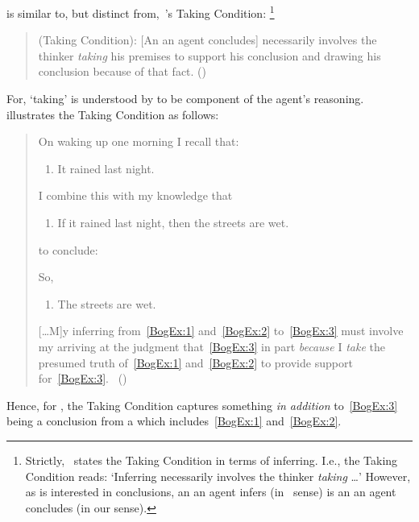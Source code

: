 \begin{note}
  \supportI{} is similar to, but distinct from,~\citeauthor{Boghossian:2014aa}'s Taking Condition:%
  \footnote{
    Strictly,~\citeauthor{Boghossian:2014aa} states the Taking Condition in terms of inferring.
    I.e., the Taking Condition reads: `Inferring necessarily involves the thinker \emph{taking} \dots'
    However, as \citeauthor{Boghossian:2008vf} is interested in conclusions, an  an agent infers (in~\citeauthor{Boghossian:2014aa} sense) is an  an agent concludes (in our sense).
  }

  \begin{quote}
    (Taking Condition):
    [An  an agent concludes] necessarily involves the thinker \emph{taking} his premises to support his conclusion and drawing his conclusion because of that fact.%
    \mbox{}\hfill\mbox{(\citeyear[5]{Boghossian:2014aa})}
  \end{quote}

  \noindent%
  For, `taking' is understood by \citeauthor{Boghossian:2014aa} to be component of the agent's reasoning.
  \citeauthor{Boghossian:2014aa} illustrates the Taking Condition as follows:
  \begin{quote}
    On waking up one morning I recall that:

    \begin{enumerate}[label=(\arabic*), ref=(\arabic*), series=BogEx]
    \item
      \label{BogEx:1}
      It rained last night.
    \end{enumerate}

    I combine this with my knowledge that

    \begin{enumerate}[label=(\arabic*), ref=(\arabic*), resume*=BogEx]
    \item
      \label{BogEx:2}
      If it rained last night, then the streets are wet.
    \end{enumerate}

    to conclude:

    So,

    \begin{enumerate}[label=(\arabic*), ref=(\arabic*), resume*=BogEx]
    \item
      \label{BogEx:3}
      The streets are wet.
    \end{enumerate}

    [\dots M]y inferring from~\ref{BogEx:1} and~\ref{BogEx:2} to~\ref{BogEx:3} must involve my arriving at the judgment that~\ref{BogEx:3} in part \emph{because} I \emph{take} the presumed truth of~\ref{BogEx:1} and~\ref{BogEx:2} to provide support for~\ref{BogEx:3}.%
    \mbox{ }\hfill\mbox{(\citeyear[2,4]{Boghossian:2014aa})}
  \end{quote}
  Hence, for \citeauthor{Boghossian:2014aa}, the Taking Condition captures something \emph{in addition} to~\ref{BogEx:3} being a conclusion from a \pool{} which includes~\ref{BogEx:1} and~\ref{BogEx:2}.


\end{note}
